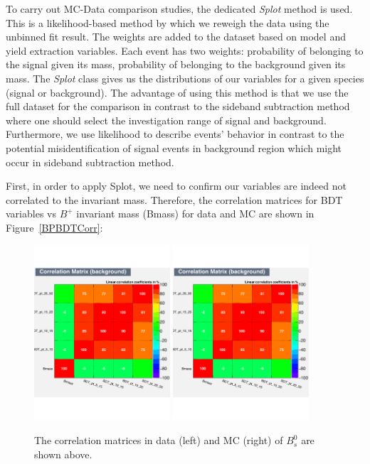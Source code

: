 To carry out MC-Data comparison studies, the dedicated \textit{Splot} method is used. This is a likelihood-based method by which we reweigh the data using the unbinned fit result. The weights are added to the dataset based on model and yield extraction variables. Each event has two weights: probability of belonging to the signal given its mass, probability of belonging to the background given its mass. The \textit{Splot} class gives us the distributions of our variables for a given species (signal or background). The advantage of using this method is that we use the full dataset for the comparison in contrast to the sideband subtraction method where one should select the investigation range of signal and background. Furthermore, we use likelihood to describe events' behavior in contrast to the potential misidentification of signal events in background region which might occur in sideband subtraction method. 

First, in order to apply Splot, we need to confirm our variables are indeed not correlated to the invariant mass. Therefore, the correlation matrices for BDT variables vs $B^+$ invariant mass (Bmass) for data and MC are shown in Figure~\ref{BPBDTCorr}:


\begin{figure}[h]
\begin{center}
\includegraphics[width=0.45\textwidth]{Figures/Chapter4/BsBDTCorrB.pdf}
\includegraphics[width=0.45\textwidth]{Figures/Chapter4/BsBDTCorrB.pdf}
\caption{The correlation matrices in data (left) and MC (right) of $B^0_s$ are shown above.}
\label{BsBDTCorr}
\end{center}
\end{figure}

